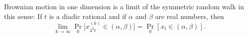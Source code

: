 Brownian motion in one dimension is a limit of the symmetric random walk in this sense: If $t$ is a diadic rational and if $\alpha$ and $\beta$ are real numbers, then
$$\lim_{k \to \infty} \Pr_0\!\bigl[x_{4^k t}^{(k)} \in (\alpha, \beta)\bigr] = \Pr_0[x_t \in (\alpha, \beta)].$$
